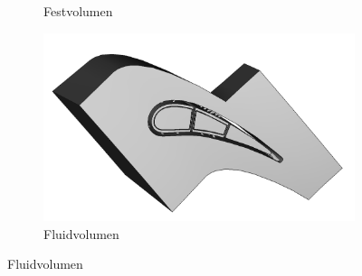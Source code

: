 \documentclass[8pt, aspectratio=169]{beamer}
\begin{document}
\begin{frame}
\begin{minipage}{\textwidth}
\begin{figure}
\begin{subfigure}{.3\textwidth}
				\caption{Festvolumen}
			\end{subfigure}
			\begin{subfigure}{.3\textwidth}
				\centering
				\includegraphics[width=\textwidth]{../../assets/solid/fluid.png}
				\caption{Fluidvolumen}
			\end{subfigure}
		\end{figure}
	\end{minipage}
\end{frame}
\end{document}
